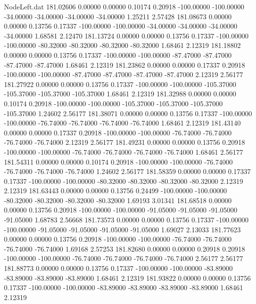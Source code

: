 \begin{filecontents}{NodeLeft.dat}
 181.02606    0.00000    0.00000     0.10174    0.20918 -100.00000 -100.00000  -34.00000  -34.00000  -34.00000  -34.00000    1.25211    2.57428
 181.08673    0.00000    0.00000     0.13756    0.17337 -100.00000 -100.00000  -34.00000  -34.00000  -34.00000  -34.00000    1.68581    2.12470
 181.13724    0.00000    0.00000     0.13756    0.17337 -100.00000 -100.00000  -80.32000  -80.32000  -80.32000  -80.32000    1.68461    2.12319
 181.18802    0.00000    0.00000     0.13756    0.17337 -100.00000 -100.00000  -87.47000  -87.47000  -87.47000  -87.47000    1.68461    2.12319
 181.23862    0.00000    0.00000     0.17337    0.20918 -100.00000 -100.00000  -87.47000  -87.47000  -87.47000  -87.47000    2.12319    2.56177
 181.27922    0.00000    0.00000     0.13756    0.17337 -100.00000 -100.00000 -105.37000 -105.37000 -105.37000 -105.37000    1.68461    2.12319
 181.32988    0.00000    0.00000     0.10174    0.20918 -100.00000 -100.00000 -105.37000 -105.37000 -105.37000 -105.37000    1.24602    2.56177
 181.38071    0.00000    0.00000     0.13756    0.17337 -100.00000 -100.00000  -76.74000  -76.74000  -76.74000  -76.74000    1.68461    2.12319
 181.43140    0.00000    0.00000     0.17337    0.20918 -100.00000 -100.00000  -76.74000  -76.74000  -76.74000  -76.74000    2.12319    2.56177
 181.49231    0.00000    0.00000     0.13756    0.20918 -100.00000 -100.00000  -76.74000  -76.74000  -76.74000  -76.74000    1.68461    2.56177
 181.54311    0.00000    0.00000     0.10174    0.20918 -100.00000 -100.00000  -76.74000  -76.74000  -76.74000  -76.74000    1.24602    2.56177
 181.58359    0.00000    0.00000     0.17337    0.17337 -100.00000 -100.00000  -80.32000  -80.32000  -80.32000  -80.32000    2.12319    2.12319
 181.63443    0.00000    0.00000     0.13756    0.24499 -100.00000 -100.00000  -80.32000  -80.32000  -80.32000  -80.32000    1.69193    3.01341
 181.68518    0.00000    0.00000     0.13756    0.20918 -100.00000 -100.00000  -91.05000  -91.05000  -91.05000  -91.05000    1.68783    2.56668
 181.73573    0.00000    0.00000     0.13756    0.17337 -100.00000 -100.00000  -91.05000  -91.05000  -91.05000  -91.05000    1.69027    2.13033
 181.77623    0.00000    0.00000     0.13756    0.20918 -100.00000 -100.00000  -76.74000  -76.74000  -76.74000  -76.74000    1.69168    2.57253
 181.82680    0.00000    0.00000     0.20918    0.20918 -100.00000 -100.00000  -76.74000  -76.74000  -76.74000  -76.74000    2.56177    2.56177
 181.88773    0.00000    0.00000     0.13756    0.17337 -100.00000 -100.00000  -83.89000  -83.89000  -83.89000  -83.89000    1.68461    2.12319
 181.93822    0.00000    0.00000     0.13756    0.17337 -100.00000 -100.00000  -83.89000  -83.89000  -83.89000  -83.89000    1.68461    2.12319

\end{filecontents}
